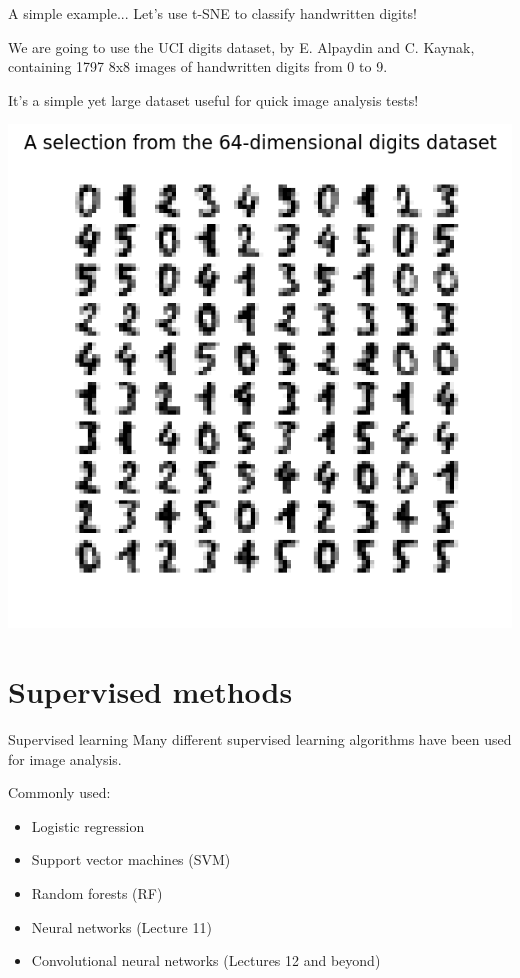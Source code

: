 \documentclass[9pt, aspectratio=169]{beamer}
\begin{document}
\begin{frame}
    {A simple example...}
    Let's use t-SNE to classify handwritten digits!

    We are going to use the UCI digits dataset, by E. Alpaydin and C. Kaynak, containing 1797 8x8 images of handwritten digits from 0 to 9.

    It's a simple yet large dataset useful for quick image analysis tests!

    \centering
    \includegraphics[width=.4\textwidth, trim=0 0 0 30, clip]{uci.png}
\end{frame}

\section {Supervised methods}

\begin{frame}
    {Supervised learning}
    Many different supervised learning algorithms have been used for image analysis.

    Commonly used:

    \begin{itemize}
        \item Logistic regression
        \item Support vector machines (SVM)
        \item Random forests (RF)
        \item Neural networks (Lecture 11)
        \item Convolutional neural networks (Lectures 12 and beyond)
    \end{itemize}
\end{frame}
\end{document}
